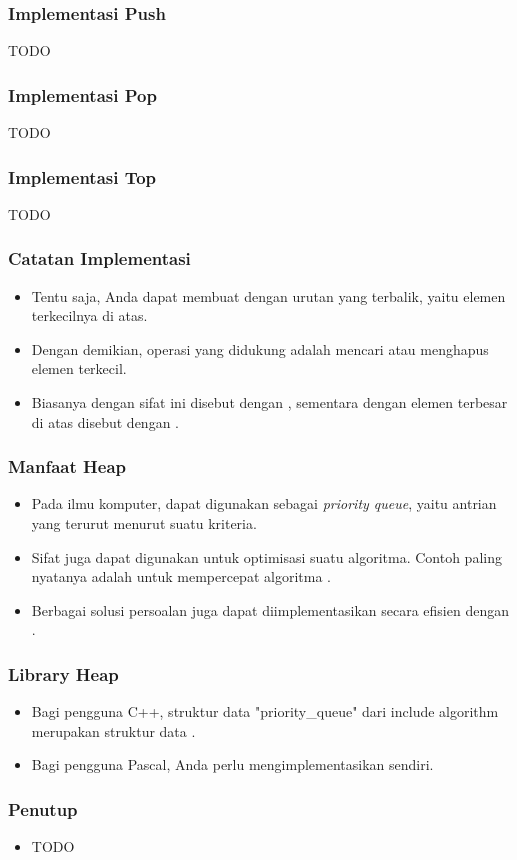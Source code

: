 \begin{frame}
\frametitle{Implementasi Push}
TODO
\end{frame}

\begin{frame}
\frametitle{Implementasi Pop}
TODO
\end{frame}

\begin{frame}
\frametitle{Implementasi Top}
TODO
\end{frame}

\begin{frame}
\frametitle{Catatan Implementasi}
\begin{itemize}
  \item Tentu saja, Anda dapat membuat \pheap dengan urutan yang terbalik, yaitu elemen terkecilnya di atas.
  \item Dengan demikian, operasi yang didukung adalah mencari atau menghapus elemen terkecil.
  \item Biasanya \pheap dengan sifat ini disebut dengan , sementara \pheap dengan elemen terbesar di atas disebut dengan .
\end{itemize}
\end{frame}

\begin{frame}
\frametitle{Manfaat Heap}
\begin{itemize}
  \item Pada ilmu komputer, \pheap dapat digunakan sebagai \textit{priority queue}, yaitu antrian yang terurut menurut suatu kriteria.
  \item Sifat \pheap juga dapat digunakan untuk optimisasi suatu algoritma. Contoh paling nyatanya adalah untuk mempercepat algoritma .
  \item Berbagai solusi persoalan  juga dapat diimplementasikan secara efisien dengan \pheap.
\end{itemize}
\end{frame}

\begin{frame}
\frametitle{Library Heap}
\begin{itemize}
  \item Bagi pengguna C++, struktur data "priority\_queue" dari include algorithm merupakan struktur data \pheap.
  \item Bagi pengguna Pascal, Anda perlu mengimplementasikan \pheap sendiri.
\end{itemize}
\end{frame}

\begin{frame}
\frametitle{Penutup}
\begin{itemize}
  \item TODO
\end{itemize}
\end{frame}




